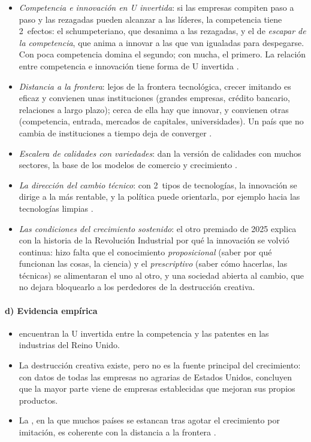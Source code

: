 \documentclass[11pt]{article}
\begin{document}
\begin{itemize}
\item \emph{Competencia e innovación en U invertida}\nocite{AghionEtAl2005}: si las empresas compiten paso a paso y las rezagadas pueden alcanzar a las líderes, la competencia tiene 2~efectos: el schumpeteriano, que desanima a las rezagadas, y el de \emph{escapar de la competencia}, que anima a innovar a las que van igualadas para despegarse. Con poca competencia domina el segundo; con mucha, el primero. La relación entre competencia e innovación tiene forma de U invertida .
\item \emph{Distancia a la frontera}\nocite{AcemogluAghionZilibotti2006}: lejos de la frontera tecnológica, crecer imitando es eficaz y convienen unas instituciones (grandes empresas, crédito bancario, relaciones a largo plazo); cerca de ella hay que innovar, y convienen otras (competencia, entrada, mercados de capitales, universidades). Un país que no cambia de instituciones a tiempo deja de converger .
\item \emph{Escalera de calidades con variedades}: \textcite{GrossmanHelpman1991Quality} dan la versión de calidades con muchos sectores, la base de los modelos de comercio y crecimiento .
\item \emph{La dirección del cambio técnico}: con 2~tipos de tecnologías, la innovación se dirige a la más rentable, y la política puede orientarla, por ejemplo hacia las tecnologías limpias\nocite{Acemoglu2012Environment} .
\item \emph{Las condiciones del crecimiento sostenido}\nocite{Mokyr2002}: el otro premiado de 2025 explica con la historia de la Revolución Industrial por qué la innovación se volvió continua: hizo falta que el conocimiento \emph{proposicional} (saber por qué funcionan las cosas, la ciencia) y el \emph{prescriptivo} (saber cómo hacerlas, las técnicas) se alimentaran el uno al otro, y una sociedad abierta al cambio, que no dejara bloquearlo a los perdedores de la destrucción creativa.
\end{itemize}

\paragraph{d) Evidencia empírica}

\begin{itemize}
\item \textcite{AghionEtAl2005} encuentran la U invertida entre la competencia y las patentes en las industrias del Reino Unido.
\item La destrucción creativa existe, pero no es la fuente principal del crecimiento: con datos de todas las empresas no agrarias de Estados Unidos, \textcite{GarciaMaciaHsiehKlenow2019How} concluyen que la mayor parte viene de empresas establecidas que mejoran sus propios productos.
\item La \nocite{GillKharas2007East}, en la que muchos países se estancan tras agotar el crecimiento por imitación, es coherente con la distancia a la frontera .
\end{itemize}
\end{document}
